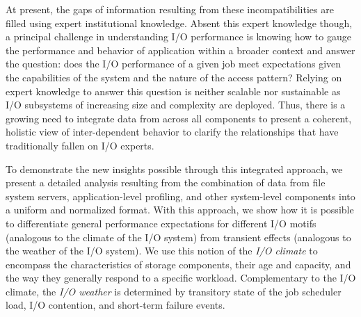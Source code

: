 At present, the gaps of information resulting from these incompatibilities are filled using expert institutional knowledge.
Absent this expert knowledge though, a principal challenge in understanding I/O performance is knowing how to gauge the performance and behavior of application within a broader context and answer the question: 
does the I/O performance of a given job meet expectations given the capabilities of the system and the nature of the access pattern?
Relying on expert knowledge to answer this question is neither scalable nor sustainable as I/O subsystems of increasing size and complexity are deployed.
Thus, there is a growing need to integrate data from across all components to present a coherent, holistic view of inter-dependent behavior to clarify the relationships that have traditionally fallen on I/O experts.

To demonstrate the new insights possible through this integrated approach, we present a detailed analysis resulting from the combination of data from file system servers, application-level profiling, and other system-level components into a uniform and normalized format.
With this approach, we show how it is possible to differentiate general performance expectations for different I/O motifs (analogous to the climate of the I/O system) from transient effects (analogous to the weather of the I/O system).
We use this notion of the \emph{I/O climate} to encompass the characteristics of storage components, their age and capacity, and the way they generally respond to a specific workload.
Complementary to the I/O climate, the \emph{I/O weather} is determined by transitory state of the job scheduler load, I/O contention, and short-term failure events.


